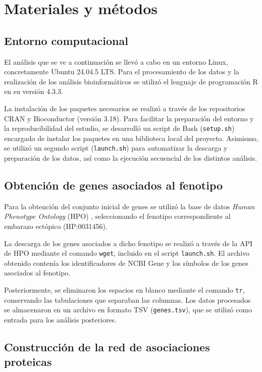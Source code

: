 \section{Materiales y métodos}

\subsection{Entorno computacional}

El análisis que se ve a continuación se llevó a cabo en un entorno Linux, concretamente Ubuntu 24.04.5 LTS. Para el procesamiento de los datos y la realización de los análisis bioinformáticos se utilizó el lenguaje de programación R en su versión 4.3.3.

La instalación de los paquetes necesarios se realizó a través de los repositorios CRAN y Bioconductor (versión 3.18). Para facilitar la preparación del entorno y la reproducibilidad del estudio, se desarrolló un script de Bash (\texttt{setup.sh}) encargado de instalar los paquetes en una biblioteca local del proyecto. Asimismo, se utilizó un segundo script (\texttt{launch.sh}) para automatizar la
descarga y preparación de los datos, así como la ejecución secuencial de los distintos análisis.

\subsection{Obtención de genes asociados al fenotipo}

Para la obtención del conjunto inicial de genes se  utilizó la base de datos \textit{Human Phenotype Ontology} (HPO) \cite{Gargano2024}, seleccionando el fenotipo correspondiente al embarazo ectópico (HP:0031456).

La descarga de los genes asociados a dicho fenotipo se realizó a través de la API de HPO mediante el comando \texttt{wget}, incluido en el script \texttt{launch.sh}. El archivo obtenido contenía los identificadores de NCBI Gene y los símbolos de los genes asociados al fenotipo.

Posteriormente, se eliminaron los espacios en blanco mediante el comando \texttt{tr}, conservando las tabulaciones que separaban las columnas. Los datos procesados se almacenaron en un archivo en formato TSV (\texttt{genes.tsv}), que se utilizó como entrada para los análisis posteriores.

\subsection{Construcción de la red de asociaciones proteicas}

